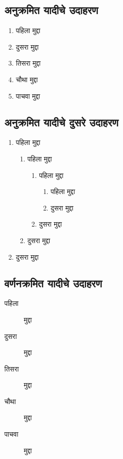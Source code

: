 \subsection{अनुक्रमित यादीचे उदाहरण}
\begin{enumerate}
\item पहिला मुद्दा
\item दुसरा मुद्दा
\item तिसरा मुद्दा
\item चौथा मुद्दा
\item पाचवा मुद्दा
\end{enumerate}
\subsection*{अनुक्रमित यादीचे दुसरे उदाहरण}
\begin{enumerate}
\item पहिला मुद्दा
\begin{enumerate}
\item पहिला मुद्दा
\begin{enumerate}
\item पहिला मुद्दा
\begin{enumerate}
\item पहिला मुद्दा
\item दुसरा मुद्दा
\end{enumerate}
\item दुसरा मुद्दा
\end{enumerate}
\item दुसरा मुद्दा
\end{enumerate}
\item दुसरा मुद्दा
\end{enumerate}
\subsection{वर्णनक्रमित यादीचे उदाहरण}
\begin{description}
\item[पहिला] मुद्दा
\item[दुसरा] मुद्दा
\item[तिसरा] मुद्दा
\item[चौथा] मुद्दा
\item[पाचवा] मुद्दा
\end{description}
